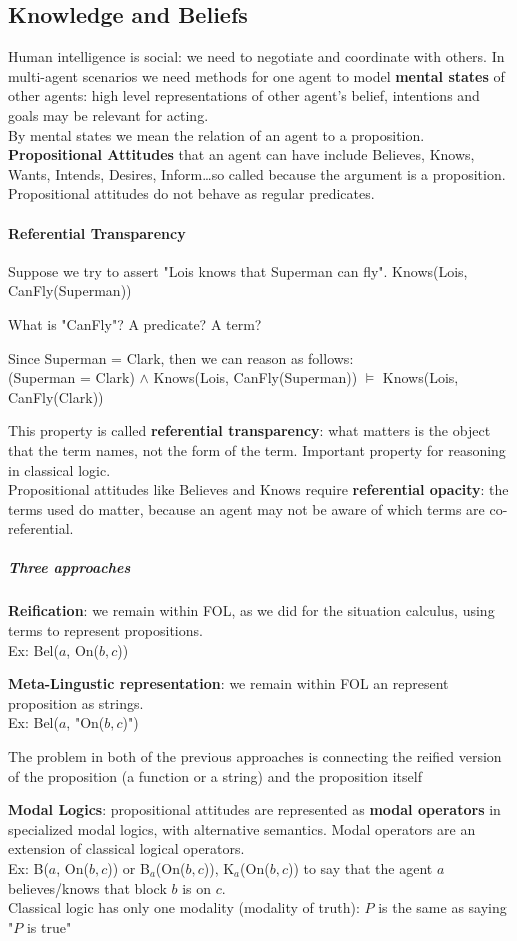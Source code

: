 \documentclass[10pt]{report}
\begin{document}
\subsection{Knowledge and Beliefs}
Human intelligence is social: we need to negotiate and coordinate with others. In multi-agent scenarios we need methods for one agent to model \textbf{mental states} of other agents: high level representations of other agent's belief, intentions and goals may be relevant for acting.\\
By mental states we mean the relation of an agent to a proposition. \textbf{Propositional Attitudes} that an agent can have include Believes, Knows, Wants, Intends, Desires, Inform\ldots so called because the argument is a proposition. Propositional attitudes do not behave as regular predicates.
\paragraph{Referential Transparency} Suppose we try to assert "Lois knows that Superman can fly". Knows(Lois, CanFly(Superman))
\begin{list}{}{}
	\item What is "CanFly"? A predicate? A term?
	\item Since Superman = Clark, then we can reason as follows:\\
	(Superman = Clark) $\wedge$ Knows(Lois, CanFly(Superman)) $\vDash$ Knows(Lois, CanFly(Clark))
\end{list}
This property is called \textbf{referential transparency}: what matters is the object that the term names, not the form of the term. Important property for reasoning in classical logic.\\
Propositional attitudes like Believes and Knows require \textbf{referential opacity}: the terms used do matter, because an agent may not be aware of which terms are co-referential.
\subparagraph{Three approaches}
\begin{list}{}{}
	\item \textbf{Reification}: we remain within FOL, as we did for the situation calculus, using terms to represent propositions.\\
	Ex: Bel($a$, On($b,c$))
	\item \textbf{Meta-Lingustic representation}: we remain within FOL an represent proposition as strings.\\
	Ex: Bel($a$, "On($b,c$)")
	\item The problem in both of the previous approaches is connecting the reified version of the proposition (a function or a string) and the proposition itself
	\item \textbf{Modal Logics}: propositional attitudes are represented as \textbf{modal operators} in specialized modal logics, with alternative semantics. Modal operators are an extension of classical logical operators.\\
	Ex: B($a$, On($b,c$)) or B$_a$(On($b,c$)), K$_a$(On($b,c$)) to say that the agent $a$ believes/knows that block $b$ is on $c$.\\
	Classical logic has only one modality (modality of truth): $P$ is the same as saying "$P$ is true"
\end{list}
\end{document}
